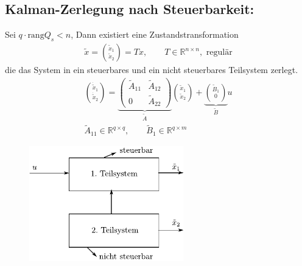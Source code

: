 \documentclass[ngerman]{tudscrreprt}
\begin{document}
\subsection*{Kalman-Zerlegung nach Steuerbarkeit:}
Sei $q\cdot \text{rang} Q_s < n$, Dann existiert eine Zustandstransformation \begin{align*}
\tilde x = \binom{\tilde x_1}{\tilde x_2} = Tx, \qquad T\in \mathbb{R}^{n\times n}, \text{ regulär}
\end{align*} 
die das System in ein steuerbares und ein nicht steuerbares Teilsystem zerlegt. 
\begin{align*}
\binom{\dot{\tilde{x}}_1}{\dot{\tilde{x}}_2} = \underbrace{\begin{pmatrix}
\tilde A_{11} & \tilde A_{12}\\ 0 & \tilde A_{22}
\end{pmatrix}}_{\tilde A}
\binom{\tilde x_1}{\tilde x_2} + \underbrace{\binom{\tilde B_1}{0}}_{\tilde B}u\\ 
\tilde A_{11} \in \mathbb{R}^{q\times q}, \qquad \tilde B_1 \in \mathbb{R}^{q\times m}
\end{align*}
\begin{figure}[H]
\centering
\def\svgwidth{200pt} 
  \includegraphics[width=6.7cm]{images/kalmanzerl.pdf}
\end{figure}
\end{document}
